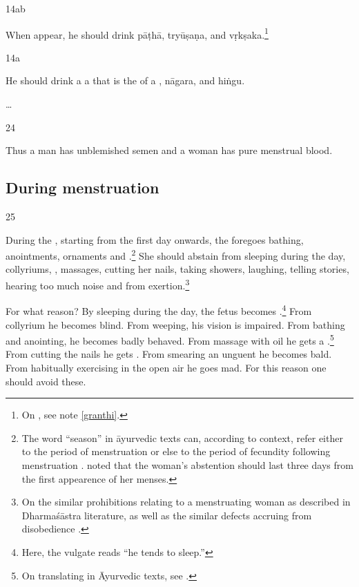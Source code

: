 \begin{translation}
\item[14ab]
 
 When  appear, he should drink \gls{pāṭhā}, 
 \gls{tryūṣaṇa}, and \gls{vṛkṣaka}.\footnote{On , see note 
 \ref{granthi}.}
 
 \item[14a] 
 
 He should drink a a  that is the
 of  a , \gls{nāgara},
and \gls{hiṅgu}.
 
\item[\ldots] 
 
\item[24]

Thus a man has unblemished semen and a woman has pure menstrual blood. 
 
 \subsection{During menstruation}
 
 \item[25]
 
During the , starting from the first day onwards, the
 foregoes bathing, anointments,
ornaments and .\footnote{The word 
    “season” in āyurvedic texts can, according to context, refer either to
    the period of menstruation or else to the period of fecundity
    following menstruation \citep[15\,ff., note 27, \emph{et
    passim}]{das-2003}.  noted that the woman's
    abstention should last three days from the first appearence of her
    menses.} She should abstain from sleeping during the day, collyriums,
    , massages, cutting her nails, taking
    showers, laughing, telling stories, hearing too much noise and from
    exertion.\footnote{On the similar prohibitions relating to a
        menstruating woman as described in Dharmaśāstra literature, as well as
        the similar defects accruing from disobedience         
        \citep[see][284--287]{lesl-1989}.}
        
For what reason?  By sleeping during the day, the fetus becomes
.\footnote{Here, the vulgate reads  “he
    tends to sleep.”} From collyrium he becomes blind.  From weeping, his
    vision is impaired. From bathing and anointing, he becomes badly
    behaved. From massage with oil he gets a .\footnote{On translating  in Āyurvedic texts, see
        \cite[96\,ff]{emme-1984}.} From cutting the nails he gets
        .  From smearing an unguent he becomes bald.
        From habitually exercising in the open air he goes mad. For this
        reason one should avoid these.
    

\end{translation}
